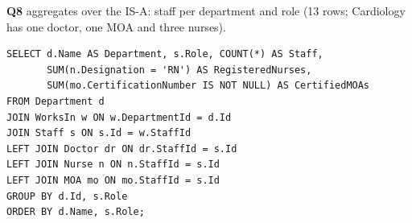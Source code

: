 \documentclass[sigconf]{acmart}
\begin{document}
\textbf{Q8} aggregates over the IS-A: staff per department and role (13 rows; Cardiology has one doctor, one MOA and three nurses).
\par\noindent\begin{minipage}{\columnwidth}\begin{lstlisting}
SELECT d.Name AS Department, s.Role, COUNT(*) AS Staff,
       SUM(n.Designation = 'RN') AS RegisteredNurses,
       SUM(mo.CertificationNumber IS NOT NULL) AS CertifiedMOAs
FROM Department d
JOIN WorksIn w ON w.DepartmentId = d.Id
JOIN Staff s ON s.Id = w.StaffId
LEFT JOIN Doctor dr ON dr.StaffId = s.Id
LEFT JOIN Nurse n ON n.StaffId = s.Id
LEFT JOIN MOA mo ON mo.StaffId = s.Id
GROUP BY d.Id, s.Role
ORDER BY d.Name, s.Role;
\end{lstlisting}\end{minipage}\par
\end{document}
